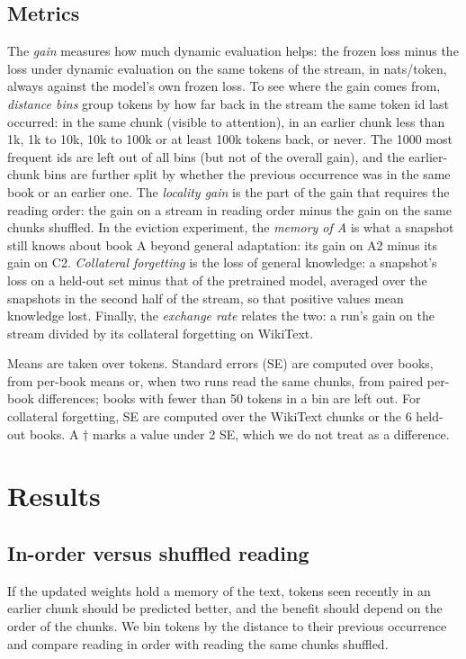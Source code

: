 \documentclass[10pt]{article}
\begin{document}
\subsection{Metrics}

The \emph{gain} measures how much dynamic evaluation helps: the frozen loss minus the loss under dynamic evaluation on the same tokens of the stream, in nats/token, always against the model's own frozen loss.
To see where the gain comes from, \emph{distance bins} group tokens by how far back in the stream the same token id last occurred: in the same chunk (visible to attention), in an earlier chunk less than 1k, 1k to 10k, 10k to 100k or at least 100k tokens back, or never.
The 1000 most frequent ids are left out of all bins (but not of the overall gain), and the earlier-chunk bins are further split by whether the previous occurrence was in the same book or an earlier one.
The \emph{locality gain} is the part of the gain that requires the reading order: the gain on a stream in reading order minus the gain on the same chunks shuffled.
In the eviction experiment, the \emph{memory of A} is what a snapshot still knows about book A beyond general adaptation: its gain on A2 minus its gain on C2.
\emph{Collateral forgetting} is the loss of general knowledge: a snapshot's loss on a held-out set minus that of the pretrained model, averaged over the snapshots in the second half of the stream, so that positive values mean knowledge lost.
Finally, the \emph{exchange rate} relates the two: a run's gain on the stream divided by its collateral forgetting on WikiText.

Means are taken over tokens.
Standard errors (SE) are computed over books, from per-book means or, when two runs read the same chunks, from paired per-book differences; books with fewer than 50 tokens in a bin are left out.
For collateral forgetting, SE are computed over the WikiText chunks or the 6 held-out books.
A $\dagger$ marks a value under 2 SE, which we do not treat as a difference.

\section{Results}

\subsection{In-order versus shuffled reading}\label{sec:local}

If the updated weights hold a memory of the text, tokens seen recently in an earlier chunk should be predicted better, and the benefit should depend on the order of the chunks.
We bin tokens by the distance to their previous occurrence and compare reading in order with reading the same chunks shuffled.
\end{document}
